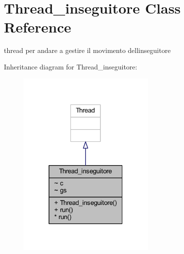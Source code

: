 \hypertarget{classcargame_1_1_thread__inseguitore}{}\section{Thread\+\_\+inseguitore Class Reference}
\label{classcargame_1_1_thread__inseguitore}


thread per andare a gestire il movimento dell\textquotesingle{}inseguitore  




Inheritance diagram for Thread\+\_\+inseguitore\+:
\nopagebreak
\begin{figure}[H]
\begin{center}
\leavevmode
\includegraphics[width=193pt]{classcargame_1_1_thread__inseguitore__inherit__graph}
\end{center}
\end{figure}



